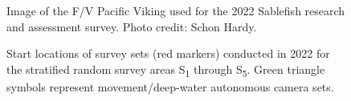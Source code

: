 \documentclass[12pt]{article}\usepackage[]{graphicx}\usepackage[]{color}
\begin{document}
\begin{figure}[htb]

{\centering {} 

}

\caption{Image of the F/V Pacific Viking used for the 2022 Sablefish research and assessment survey. Photo credit: Schon Hardy.}\label{fig:figure2}
\end{figure}
\clearpage


\begin{figure}[htb]

{\centering {} 

}

\caption{Start locations of survey sets (red markers) conducted in 2022 for the stratified random survey areas S\textsubscript{1} through S\textsubscript{5}. Green triangle symbols represent movement/deep-water autonomous camera sets.}\label{fig:figure3}
\end{figure}
\clearpage
\end{document}
